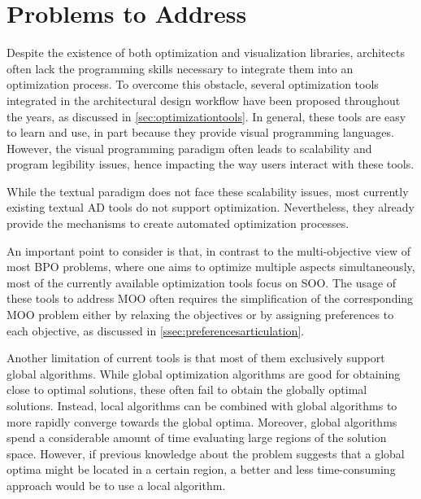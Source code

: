 	\section{Problems to Address}
	\label{sec:problemsaddress}
	
	Despite the existence of both optimization and visualization libraries, architects often lack the programming skills necessary to integrate them into an optimization process. To overcome this obstacle, 
	several optimization tools integrated in the architectural design workflow have been proposed throughout the years, as discussed in \cref{sec:optimizationtools}. In general, these tools are easy to learn and use, in part because they provide  visual programming languages. However, the visual programming paradigm often leads to scalability and program legibility issues, hence impacting the way users interact with these tools. 
	
	While the textual paradigm does not face these scalability issues, most currently existing textual \ac{AD} tools do not support optimization. Nevertheless, they already provide the mechanisms to create automated optimization processes.
	
	An important point to consider is that, in contrast to the multi-objective view of most \ac{BPO} problems, where one aims to optimize multiple aspects simultaneously, most of the currently available optimization tools focus on \ac{SOO}. The usage of these tools to address \ac{MOO} often requires the simplification of the corresponding \ac{MOO} problem either by relaxing the objectives or by assigning preferences to each objective, as discussed in \cref{ssec:preferencesarticulation}.
	
	Another limitation of current tools is that most of them exclusively support global algorithms. While global optimization algorithms are good for obtaining close to optimal solutions, these often fail to obtain the globally optimal solutions. Instead, local algorithms can be combined with global algorithms to more rapidly converge towards the global optima. Moreover, global algorithms spend a considerable amount of time evaluating large regions of the solution space. However, if previous knowledge about the problem suggests that a global optima might be located in a certain region, a better and less time-consuming approach would be to use a local algorithm.
	

